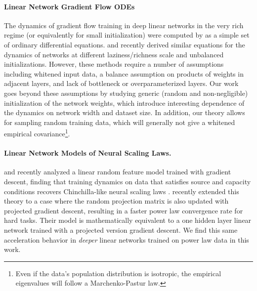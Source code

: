 \vspace{-8pt}
\paragraph{Linear Network Gradient Flow ODEs} The dynamics of gradient flow training in deep linear networks in the very rich regime (or equivalently for small initialization) were computed by \citet{saxe2013exact, atanasov2022neural} as a simple set of ordinary differential equations.  \citet{kunin2024get} and \citet{domine2024lazy} recently derived similar equations for the dynamics of networks at different laziness/richness scale and unbalanced initializations. However, these methods require a number of assumptions including whitened input data, a balance assumption on products of weights in adjacent layers, and lack of bottleneck or overparameterized layers. Our work goes beyond these assumptions by studying generic (random and non-negligible) initialization of the network weights, which introduce interesting dependence of the dynamics on network width and dataset size. In addition, our theory allows for sampling random training data, which will generally not give a whitened empirical covariance\footnote{Even if the data's population distribution is isotropic, the empirical eigenvalues will follow a Marchenko-Pastur law.}. 

\vspace{-10pt}
\paragraph{Linear Network Models of Neural Scaling Laws.} \citet{bordelon2024dynamical} and \citet{paquette20244+} recently analyzed a linear random feature model trained with gradient descent, finding that training dynamics on data that satisfies source and capacity conditions recovers Chinchilla-like neural scaling laws \cite{hoffmann2022training}. \citet{bordelon2024featurelearningimproveneural} recently extended this theory to a case where the random projection matrix is also updated with projected gradient descent, resulting in a faster power law convergence rate for hard tasks. Their model is mathematically equivalent to a one hidden layer linear network trained with a projected version gradient descent. We find this same acceleration behavior in \textit{deeper} linear networks trained on power law data in this work.  

\vspace{-10pt}
